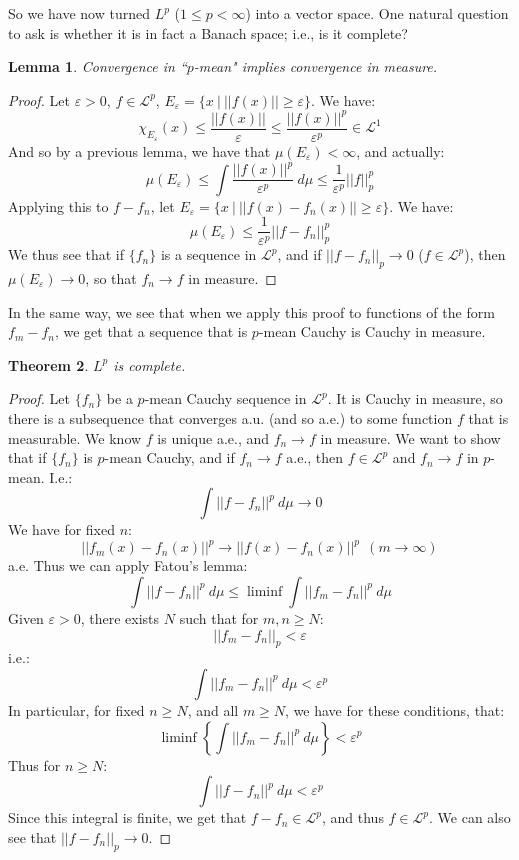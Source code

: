 \documentclass[a4paper,12pt]{report}
\newcommand{\ms}[1]{\mathscr{#1}}
\newcommand{\varep}{ \varepsilon }
\newtheorem{theorem}{Theorem}[section]
\newtheorem{lemma}[theorem]{Lemma}
\newenvironment{remark}[1][Remark.]{\begin{trivlist}
\item[\hskip \labelsep {\bfseries #1}]}{\end{trivlist}}
\begin{document}
	\noindent So we have now turned $L^p$ ($1 \leq p < \infty$) into a vector space. One natural question to ask is whether it is in fact a Banach space; i.e., is it complete?
	
	\begin{lemma}
	Convergence in ``$p$-mean" implies convergence in measure. 
	\end{lemma}
	\begin{proof}
	Let $\varep > 0$, $f \in \ms{L}^p$, $E_\varep = \{x ~|~ ||f(x)|| \geq \varep \}$. We have:
	\[ \chi_{E_\varep}(x) \leq \frac{||f(x)||}{\varep} \leq \frac{||f(x)||^p}{\varep^p} \in \ms{L}^1 \]
	And so by a previous lemma, we have that $\mu(E_\varep) < \infty$, and actually:
	\[ \mu(E_\varep) \leq \int \frac{||f(x)||^p}{\varep^p} ~ d\mu \leq \frac{1}{\varep^p} ||f||_p^p \]
	Applying this to $f - f_n$, let $E_\varep = \{x ~|~ ||f(x) - f_n(x)|| \geq \varep \}$. We have:
	\[ \mu(E_\varep) \leq \frac{1}{\varep^p}||f - f_n||_p^p \]
	We thus see that if $\{f_n\}$ is a sequence in $\ms{L}^p$, and if $||f - f_n||_p \rightarrow 0$ ($f \in \ms{L}^p$), then $\mu(E_\varep) \rightarrow 0$, so that $f_n \rightarrow f$ in measure. 
	\end{proof}
	
	\begin{remark}
	In the same way, we see that when we apply this proof to functions of the form $f_m - f_n$, we get that a sequence that is $p$-mean Cauchy is Cauchy in measure. 
	\end{remark}
	
	\begin{theorem}
	$L^p$ is complete. 
	\end{theorem}
	\begin{proof}
	Let $\{f_n\}$ be a $p$-mean Cauchy sequence in $\ms{L}^p$. It is Cauchy in measure, so there is a subsequence that converges a.u. (and so a.e.) to some function $f$ that is measurable. We know $f$ is unique a.e., and $f_n \rightarrow f$ in measure. 
	We want to show that if $\{f_n\}$ is $p$-mean Cauchy, and if $f_n \rightarrow f$ a.e., then $f \in \ms{L}^p$ and $f_n \rightarrow f$ in $p$-mean. I.e.:
	\[ \int ||f - f_n||^p ~ d\mu \rightarrow 0 \]
	We have for fixed $n$:
	\[ ||f_m(x) - f_n(x)||^p \rightarrow ||f(x) - f_n(x)||^p ~~ (m \rightarrow \infty)\]
	a.e. Thus we can apply Fatou's lemma:
	\[ \int ||f - f_n||^p ~ d\mu \leq \liminf \int ||f_m - f_n||^p ~ d\mu \]
	Given $\varep > 0$, there exists $N$ such that for $m, n \geq N$:
	\[ ||f_m - f_n||_p < \varep \]
	i.e.:
	\[ \int ||f_m - f_n||^p ~ d\mu < \varep^p \]
	In particular, for fixed $n \geq N$, and all $m \geq N$, we have for these conditions, that:
	\[ \liminf \left\{ \int ||f_m - f_n||^p ~ d\mu \right\} < \varep^p \]
	Thus for $n \geq N$:
	\[ \int ||f - f_n||^p ~ d\mu < \varep^p \]
	Since this integral is finite, we get that $f - f_n \in \ms{L}^p$, and thus $f \in \ms{L}^p$. We can also see that $||f - f_n||_p \rightarrow 0$. 
	\end{proof}

		 
\end{document}
